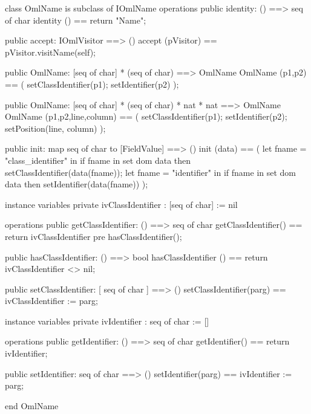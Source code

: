 \begin{vdm_al}
class OmlName is subclass of IOmlName
operations
  public identity: () ==> seq of char
  identity () == return "Name";

  public accept: IOmlVisitor ==> ()
  accept (pVisitor) == pVisitor.visitName(self);

  public OmlName:
    [seq of char] *
    (seq of char) ==> OmlName
  OmlName (p1,p2) == 
    ( setClassIdentifier(p1);
      setIdentifier(p2) );

  public OmlName:
    [seq of char] *
    (seq of char) *
    nat *
    nat ==> OmlName
  OmlName (p1,p2,line,column) == 
    ( setClassIdentifier(p1);
      setIdentifier(p2);
      setPosition(line, column) );

  public init: map seq of char to [FieldValue] ==> ()
  init (data) ==
    ( let fname = "class_identifier" in
        if fname in set dom data
        then setClassIdentifier(data(fname));
      let fname = "identifier" in
        if fname in set dom data
        then setIdentifier(data(fname)) );

instance variables
  private ivClassIdentifier : [seq of char] := nil

operations
  public getClassIdentifier: () ==> seq of char
  getClassIdentifier() == return ivClassIdentifier
    pre hasClassIdentifier();

  public hasClassIdentifier: () ==> bool
  hasClassIdentifier () == return ivClassIdentifier <> nil;

  public setClassIdentifier: [ seq of char ] ==> ()
  setClassIdentifier(parg) == ivClassIdentifier := parg;

instance variables
  private ivIdentifier : seq of char := []

operations
  public getIdentifier: () ==> seq of char
  getIdentifier() == return ivIdentifier;

  public setIdentifier: seq of char ==> ()
  setIdentifier(parg) == ivIdentifier := parg;

end OmlName
\end{vdm_al}

